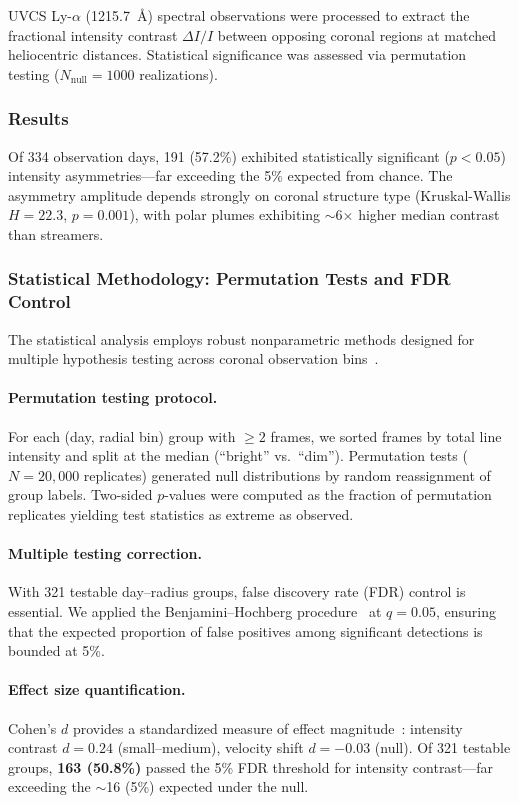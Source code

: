 UVCS Ly-$\alpha$ (1215.7~\AA) spectral observations were processed to extract 
the fractional intensity contrast $\Delta I/I$ between opposing coronal regions 
at matched heliocentric distances. Statistical significance was assessed via 
permutation testing ($N_\mathrm{null} = 1000$ realizations).

\subsubsection{Results}

Of 334 observation days, 191 (57.2\%) exhibited statistically significant 
($p < 0.05$) intensity asymmetries---far exceeding the 5\% expected from chance. 
The asymmetry amplitude depends strongly on coronal structure type 
(Kruskal-Wallis $H = 22.3$, $p = 0.001$), with polar plumes exhibiting 
$\sim$6$\times$ higher median contrast than streamers.

\subsubsection{Statistical Methodology: Permutation Tests and FDR Control}

The statistical analysis employs robust nonparametric methods designed for 
multiple hypothesis testing across coronal observation bins~\cite{Ernst2004}.

\paragraph{Permutation testing protocol.}
For each (day, radial bin) group with $\geq 2$ frames, we sorted frames by 
total line intensity and split at the median (``bright'' vs.\ ``dim''). 
Permutation tests ($N = 20{,}000$ replicates) generated null distributions 
by random reassignment of group labels. Two-sided $p$-values were computed 
as the fraction of permutation replicates yielding test statistics as 
extreme as observed.

\paragraph{Multiple testing correction.}
With 321 testable day--radius groups, false discovery rate (FDR) control is 
essential. We applied the Benjamini--Hochberg procedure~\cite{BenjaminiHochberg1995} 
at $q = 0.05$, ensuring that the expected proportion of false positives among 
significant detections is bounded at 5\%.

\paragraph{Effect size quantification.}
Cohen's $d$ provides a standardized measure of effect magnitude~\cite{Cohen1988}:
intensity contrast $d = 0.24$ (small--medium), velocity shift $d = -0.03$ (null).
Of 321 testable groups, \textbf{163 (50.8\%)} passed the 5\% FDR threshold for 
intensity contrast---far exceeding the $\sim$16 (5\%) expected under the null.

